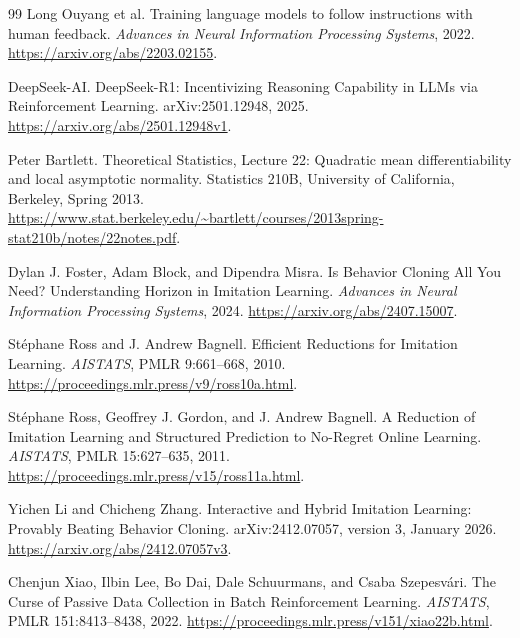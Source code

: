 \documentclass[11pt,twoside]{article}
\theoremstyle{definition}
\theoremstyle{remark}
\begin{document}
\clearpage
\begin{thebibliography}{99}
Long Ouyang et al.
\newblock Training language models to follow instructions with human feedback.
\newblock \emph{Advances in Neural Information Processing Systems}, 2022.
\newblock \url{https://arxiv.org/abs/2203.02155}.

DeepSeek-AI.
\newblock DeepSeek-R1: Incentivizing Reasoning Capability in LLMs via
Reinforcement Learning.
\newblock arXiv:2501.12948, 2025.
\newblock \url{https://arxiv.org/abs/2501.12948v1}.

Peter Bartlett.
\newblock Theoretical Statistics, Lecture 22: Quadratic mean differentiability
and local asymptotic normality.
\newblock Statistics 210B, University of California, Berkeley, Spring 2013.
\newblock \url{https://www.stat.berkeley.edu/~bartlett/courses/2013spring-stat210b/notes/22notes.pdf}.

Dylan J. Foster, Adam Block, and Dipendra Misra.
\newblock Is Behavior Cloning All You Need? Understanding Horizon in Imitation Learning.
\newblock \emph{Advances in Neural Information Processing Systems}, 2024.
\newblock \url{https://arxiv.org/abs/2407.15007}.

St\'ephane Ross and J. Andrew Bagnell.
\newblock Efficient Reductions for Imitation Learning.
\newblock \emph{AISTATS}, PMLR 9:661--668, 2010.
\newblock \url{https://proceedings.mlr.press/v9/ross10a.html}.

St\'ephane Ross, Geoffrey J. Gordon, and J. Andrew Bagnell.
\newblock A Reduction of Imitation Learning and Structured Prediction
to No-Regret Online Learning.
\newblock \emph{AISTATS}, PMLR 15:627--635, 2011.
\newblock \url{https://proceedings.mlr.press/v15/ross11a.html}.

Yichen Li and Chicheng Zhang.
\newblock Interactive and Hybrid Imitation Learning: Provably Beating Behavior Cloning.
\newblock arXiv:2412.07057, version 3, January 2026.
\newblock \url{https://arxiv.org/abs/2412.07057v3}.

Chenjun Xiao, Ilbin Lee, Bo Dai, Dale Schuurmans, and Csaba Szepesv\'ari.
\newblock The Curse of Passive Data Collection in Batch Reinforcement Learning.
\newblock \emph{AISTATS}, PMLR 151:8413--8438, 2022.
\newblock \url{https://proceedings.mlr.press/v151/xiao22b.html}.
\end{thebibliography}
\end{document}
